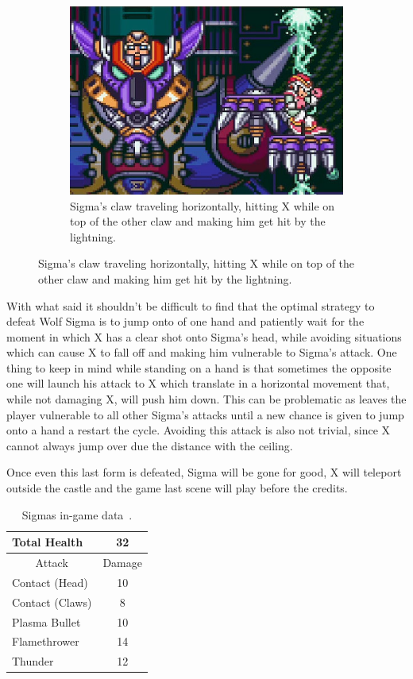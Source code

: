 \begin{figure}[htp]
	\centering
	\begin{subfigure}{0.5\linewidth}
	\centering
	\includegraphics[width=\linewidth]{figures/X1/Sigma_stages/WolfSigma_claw_2.jpg}
	\caption{Sigma's claw traveling horizontally, hitting X while on top of the other claw and making him get hit by the lightning.}
	\end{subfigure}
\end{figure}

With what said it shouldn't be difficult to find that the optimal strategy to defeat Wolf Sigma is to jump onto of one hand and patiently wait for the moment in which X has a clear shot onto Sigma's head, while avoiding situations which can cause X to fall off and making him vulnerable to Sigma's attack. One thing to keep in mind while standing on a hand is that sometimes the opposite one will launch his attack to X which translate in a horizontal movement that, while not damaging X, will push him down. This can be problematic as leaves the player vulnerable to all other Sigma's attacks until a new chance is given to jump onto a hand a restart the cycle. Avoiding this attack is also not trivial, since X cannot always jump over due the distance with the ceiling.

Once even this last form is defeated, Sigma will be gone for good, X will teleport outside the castle and the game last scene will play before the credits.
\begin{table}
	\centering
	\begin{tabular}[h]{l c}
		\toprule
		Total Health  & 32\\
		\midrule
		\multicolumn{1}{c}{Attack} & \multicolumn{1}{c}{Damage}\\
		Contact (Head) & 10\\
		Contact (Claws) & 8\\
		Plasma Bullet & 10\\
		Flamethrower & 14\\
		Thunder & 12\\
		\bottomrule
	\end{tabular}
	\caption{Sigmas in-game data~\cite{wiki:Sigma}.}
\end{table}

